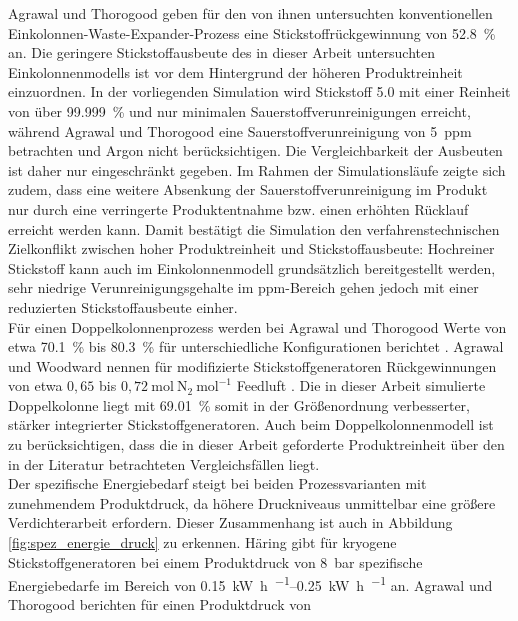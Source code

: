 Agrawal und Thorogood \cite{agrawalProductionMediumPressure1991} geben für den von ihnen untersuchten konventionellen Einkolonnen-Waste-Expander-Prozess eine Stickstoffrückgewinnung von \SI{52,8}{\percent} an. Die geringere Stickstoffausbeute des in dieser Arbeit untersuchten Einkolonnenmodells ist vor dem Hintergrund der höheren Produktreinheit einzuordnen. In der vorliegenden Simulation wird Stickstoff 5.0 mit einer Reinheit von über \SI{99,999}{\percent} und nur minimalen Sauerstoffverunreinigungen erreicht, während Agrawal und Thorogood eine Sauerstoffverunreinigung von \SI{5}{ppm} betrachten und Argon nicht berücksichtigen. Die Vergleichbarkeit der Ausbeuten ist daher nur eingeschränkt gegeben. Im Rahmen der Simulationsläufe zeigte sich zudem, dass eine weitere Absenkung der Sauerstoffverunreinigung im Produkt nur durch eine verringerte Produktentnahme bzw. einen erhöhten Rücklauf erreicht werden kann. Damit bestätigt die Simulation den verfahrenstechnischen Zielkonflikt zwischen hoher Produktreinheit und Stickstoffausbeute: Hochreiner Stickstoff kann auch im Einkolonnenmodell grundsätzlich bereitgestellt werden, sehr niedrige Verunreinigungsgehalte im ppm-Bereich gehen jedoch mit einer reduzierten Stickstoffausbeute einher.\\
Für einen Doppelkolonnenprozess werden bei Agrawal und Thorogood Werte von etwa \SI{70,1}{\percent} bis \SI{80,3}{\percent} für unterschiedliche Konfigurationen berichtet \cite{agrawalProductionMediumPressure1991}. Agrawal und Woodward nennen für modifizierte Stickstoffgeneratoren Rückgewinnungen von etwa \(0{,}65\) bis \(0{,}72~\mathrm{mol~N_2~mol^{-1}}\) Feedluft \cite{agrawalEfficientCryogenicNitrogen1991}. Die in dieser Arbeit simulierte Doppelkolonne liegt mit \SI{69,01}{\percent} somit in der Größenordnung verbesserter, stärker integrierter Stickstoffgeneratoren. Auch beim Doppelkolonnenmodell ist zu berücksichtigen, dass die in dieser Arbeit geforderte Produktreinheit über den in der Literatur betrachteten Vergleichsfällen liegt. \\
Der spezifische Energiebedarf steigt bei beiden Prozessvarianten mit zunehmendem Produktdruck, da höhere Druckniveaus unmittelbar eine größere Verdichterarbeit erfordern. Dieser Zusammenhang ist auch in Abbildung \ref{fig:spez_energie_druck} zu erkennen. 
Häring \cite{heinz-wolfgangharingAirGasesNitrogen2007} gibt für kryogene Stickstoffgeneratoren bei einem Produktdruck von
\SI{8}{bar} spezifische Energiebedarfe im Bereich von
\SIrange{0.15}{0.25}{\kilo\watt\hour\per\normalcubicmetre}
an. Agrawal und Thorogood \cite{agrawalProductionMediumPressure1991} berichten für einen Produktdruck von
